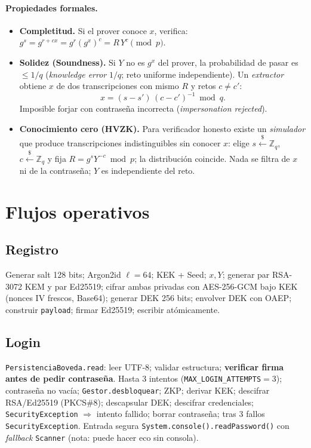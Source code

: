 \documentclass[11pt,a4paper]{article}
\newcommand{\Zq}{\mathbb{Z}_q}
\begin{document}
\paragraph{Propiedades formales.}
\begin{itemize}
  \item \textbf{Completitud.} Si el prover conoce $x$, verifica:
    $g^{s} = g^{r+cx} = g^{r}(g^{x})^{c} = R\,Y^{c} \pmod p$.\;\checkmark
  \item \textbf{Solidez (Soundness).} Si $Y$ no es $g^{x}$ del prover, la
    probabilidad de pasar es $\le 1/q$ (\emph{knowledge error} $1/q$; reto
    uniforme independiente). Un \emph{extractor} obtiene $x$ de dos transcripciones
    con mismo $R$ y retos $c \neq c'$:
    \[
      x = (s - s')\,(c - c')^{-1} \bmod q .
    \]
    Imposible forjar con contraseña incorrecta (\emph{impersonation rejected}).
  \item \textbf{Conocimiento cero (HVZK).} Para verificador honesto existe un
    \emph{simulador} que produce transcripciones indistinguibles sin conocer $x$:
    elige $s \xleftarrow{\$} \Zq$, $c \xleftarrow{\$} \Zq$ y fija
    $R = g^{s}Y^{-c} \bmod p$; la distribución coincide. Nada se filtra de $x$
    ni de la contraseña; $Y$ es independiente del reto.
\end{itemize}

\section{Flujos operativos}

\subsection{Registro}
Generar salt 128 bits; Argon2id $\ell=64$; KEK + Seed; $x, Y$; generar par RSA-3072
KEM y par Ed25519; cifrar ambas privadas con AES-256-GCM bajo KEK (nonces IV
frescos, Base64); generar DEK 256 bits; envolver DEK con OAEP; construir
\texttt{payload}; firmar Ed25519; escribir atómicamente.

\subsection{Login}
\texttt{PersistenciaBoveda.read}: leer UTF-8; validar estructura; \textbf{verificar
firma antes de pedir contraseña}. Hasta 3 intentos (\texttt{MAX\_LOGIN\_ATTEMPTS}$=3$);
contraseña no vacía; \texttt{Gestor.desbloquear}; ZKP; derivar KEK; descifrar
RSA/Ed25519 (PKCS\#8); descapsular DEK; descifrar credenciales; \texttt{SecurityException}
$\Rightarrow$ intento fallido; borrar contraseña; tras 3 fallos \texttt{SecurityException}.
Entrada segura \texttt{System.console().readPassword()} con \emph{fallback}
\texttt{Scanner} (nota: puede hacer eco sin consola).
\end{document}
